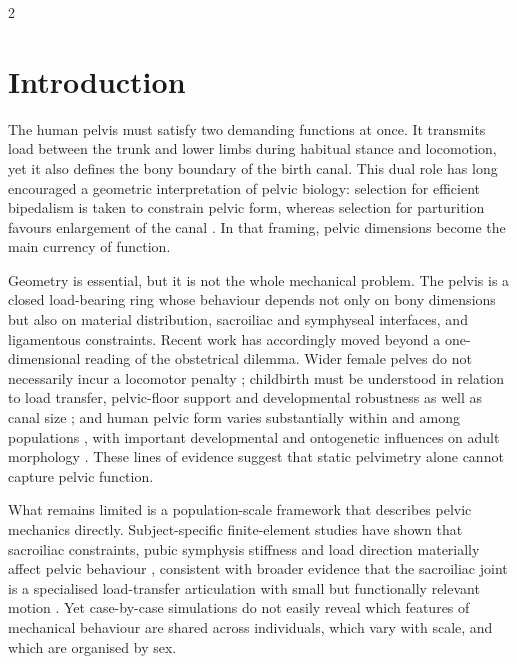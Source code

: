 \documentclass[openacc]{rsproca_new}
\begin{document}
\begin{multicols}{2}

\section{Introduction}

The human pelvis must satisfy two demanding functions at once. It transmits load between the trunk and lower limbs during habitual stance and locomotion, yet it also defines the bony boundary of the birth canal. This dual role has long encouraged a geometric interpretation of pelvic biology: selection for efficient bipedalism is taken to constrain pelvic form, whereas selection for parturition favours enlargement of the canal \cite{RosenbergTrevathan2002,Trevathan2015,Grunstra2023}. In that framing, pelvic dimensions become the main currency of function.

Geometry is essential, but it is not the whole mechanical problem. The pelvis is a closed load-bearing ring whose behaviour depends not only on bony dimensions but also on material distribution, sacroiliac and symphyseal interfaces, and ligamentous constraints. Recent work has accordingly moved beyond a one-dimensional reading of the obstetrical dilemma. Wider female pelves do not necessarily incur a locomotor penalty \cite{Warrener2015}; childbirth must be understood in relation to load transfer, pelvic-floor support and developmental robustness as well as canal size \cite{Pavlicev2020,Haeusler2021,Grunstra2019,Grunstra2023}; and human pelvic form varies substantially within and among populations \cite{BettiManica2018,Auerbach2018}, with important developmental and ontogenetic influences on adult morphology \cite{VerbruggenNowlan2017,Novak2020,KurkiDecrausaz2015}. These lines of evidence suggest that static pelvimetry alone cannot capture pelvic function.

What remains limited is a population-scale framework that describes pelvic mechanics directly. Subject-specific finite-element studies have shown that sacroiliac constraints, pubic symphysis stiffness and load direction materially affect pelvic behaviour \cite{Eichenseer2011,Hammer2013}, consistent with broader evidence that the sacroiliac joint is a specialised load-transfer articulation with small but functionally relevant motion \cite{Vleeming2012,Kiapour2019,ChoKwak2020}. Yet case-by-case simulations do not easily reveal which features of mechanical behaviour are shared across individuals, which vary with scale, and which are organised by sex.


\end{multicols}
\end{document}
